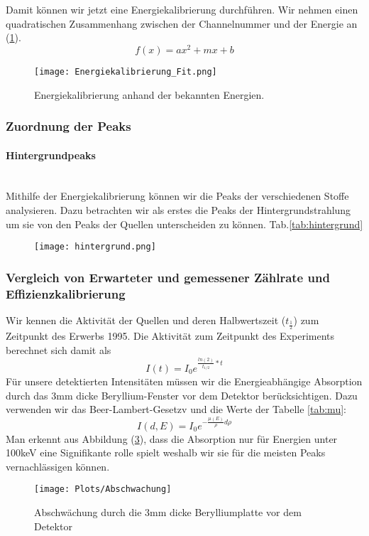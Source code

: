 \documentclass[]{article}
\begin{document}
	Damit können wir jetzt eine Energiekalibrierung durchführen. Wir nehmen einen quadratischen Zusammenhang zwischen der Channelnummer und der Energie an (\ref{fig:energiekalibrierung-fit}).
	\begin{equation}
	f(x)=ax^2+mx+b
	\end{equation}
	\begin{figure}
		\centering
		\texttt{[image: Energiekalibrierung\_Fit.png]}
		\caption{Energiekalibrierung anhand der bekannten Energien.}
		\label{fig:energiekalibrierung-fit}
	\end{figure}
	
	\subsubsection{Zuordnung der Peaks}
	\paragraph{Hintergrundpeaks}\mbox{} \\
	Mithilfe der Energiekalibrierung können wir die Peaks der verschiedenen Stoffe analysieren. Dazu betrachten wir als erstes die Peaks der Hintergrundstrahlung um sie von den Peaks der Quellen unterscheiden zu können. Tab.\ref{tab:hintergrund}
	\begin{figure}[H]
		\centering
		\texttt{[image: hintergrund.png]}
		\caption{}
		\label{fig:hintergrund}
	\end{figure}
	

	
	
	\subsubsection{Vergleich von Erwarteter und gemessener Zählrate und Effizienzkalibrierung}
	Wir kennen die Aktivität der Quellen und deren Halbwertszeit ($t_\frac{1}{2}$) zum Zeitpunkt des Erwerbs 1995. Die Aktivität zum Zeitpunkt des Experiments berechnet sich damit als
	\begin{equation}
	I(t)=I_0e^{\frac{ln(2)}{t_{1/2}}*t}
	\end{equation}
	Für unsere detektierten Intensitäten müssen wir die Energieabhängige Absorption durch das 3mm dicke Beryllium-Fenster vor dem Detektor berücksichtigen. Dazu verwenden wir das Beer-Lambert-Gesetzv und die Werte der Tabelle \ref{tab:mu}:
	\begin{equation}
	I(d,E)=I_0e^{-\frac{\mu(E)}{\rho}d\rho}
	\end{equation} 
	Man erkennt aus Abbildung (\ref{fig:abschwachung}), dass die Absorption nur für Energien unter 100keV eine Signifikante rolle spielt weshalb wir sie für die meisten Peaks vernachlässigen können.
	\begin{figure}
		\centering
		\texttt{[image: Plots/Abschwachung]}
		\caption{Abschwächung durch die 3mm dicke Berylliumplatte vor dem Detektor}
		\label{fig:abschwachung}
	\end{figure}
	
\end{document}
